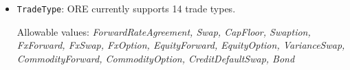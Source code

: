 \begin{itemize}
%
\item {\tt TradeType}: %
ORE currently supports 14 trade types.

Allowable values: \emph{ForwardRateAgreement, Swap, CapFloor, Swaption, FxForward, FxSwap, FxOption,
EquityForward, EquityOption, VarianceSwap, CommodityForward, CommodityOption, CreditDefaultSwap, Bond}

\end{itemize}
